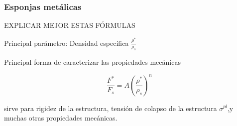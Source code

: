 \documentclass[usenames,dvipsnames]{beamer}
\begin{document}
% 
% 
% 



\begin{frame}
\frametitle{Esponjas metálicas}

EXPLICAR MEJOR ESTAS FÓRMULAS

Principal parámetro: Densidad específica $\frac{\rho^*}{\rho_s}$

Principal forma de caracterizar las propiedades mecánicas 

\begin{equation*}
\frac{F^*}{F_s}=A \left(\frac{\rho^*}{\rho_s}\right)^n \label{props} 
\end{equation*}

sirve para rigidez de la estructura, tensión de colapso de la estructura $\sigma^{pl}$,y muchas otras propiedades mecánicas.


\end{frame}


\end{document}
